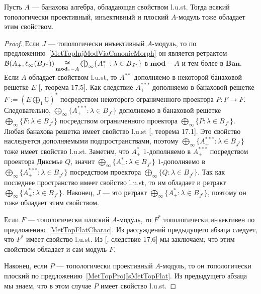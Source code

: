 \begin{proposition} Пусть $A$ --- банахова алгебра, обладающая свойством l.u.st.
Тогда всякий топологически проективный, инъективный и плоский $A$-модуль тоже
обладает этим свойством.
\end{proposition}
\begin{proof} Если $J$ --- топологически инъективный $A$-модуль, то по
предложению~\ref{MetTopInjModViaCanonicMorph} он является ретрактом
$\mathcal{B}(A_+,\ell_\infty(B_{J^*}))\mathop{\mathbin{\cong}}\limits_{\mathbf{mod}_1-A}\bigoplus_\infty
\{ A_+^*:\lambda\in B_{J^*} \}$ в $\mathbf{mod}-A$ и тем более в $\mathbf{Ban}$.
Если $A$ обладает свойством l.u.st, то $A^{**}$ дополняемо в некоторой банаховой
решетке $E$ [\cite{DiestAbsSumOps}, теорема 17.5]. Как следствие $A_+^{***}$
дополняемо в банаховой решетке $F:={\left(E\bigoplus_1\mathbb{C}\right)}^*$
посредством некоторого ограниченного проектора $P:F\to F$. Следовательно,
$\bigoplus_\infty \{A_+^{***}:\lambda\in B_{J^*} \}$ дополняемо в банаховой
решетке $\bigoplus_\infty \{F:\lambda\in B_{J^*} \}$ посредством ограниченного
проектора $\bigoplus_\infty \{ P:\lambda\in B_{J^*} \}$. Любая банахова решетка
имеет свойство l.u.st [\cite{DiestAbsSumOps}, теорема 17.1]. Это свойство
наследуется дополняемыми подпространствами, поэтому $\bigoplus_\infty
\{A_+^{***}:\lambda\in B_{J^*} \}$ тоже имеет свойство l.u.st. Заметим, что
$A_+^*$ $1$-дополняемо в $A_+^{***}$ посредством проектора Диксмье $Q$, значит
$\bigoplus_\infty \{A_+^*:\lambda\in B_{J^*} \}$ $1$-дополняемо в
$\bigoplus_\infty \{A_+^{***}:\lambda\in B_{J^*} \}$ посредством проектора
$\bigoplus_\infty \{Q:\lambda\in B_{J^*} \}$. Так как последнее пространство
имеет свойство l.u.st, то им обладает и ретракт $\bigoplus_\infty
\{A_+^*:\lambda\in B_{J^*} \}$. Наконец, $J$ --- это ретракт $\bigoplus_\infty
\{A_+^*:\lambda\in B_{J^*} \}$, поэтому он тоже обладает этим свойством.

Если $F$ --- топологически плоский $A$-модуль, то $F^*$ топологически инъективен
по предложению~\ref{MetTopFlatCharac}. Из рассуждений предыдущего абзаца
следует, что $F^*$ имеет свойство l.u.st. Из [\cite{DiestAbsSumOps}, следствие
17.6] мы заключаем, что этим свойством обладает и сам модуль $F$.

Наконец, если $P$ --- топологически проективный $A$-модуль, то он топологически
плоский по предложению~\ref{MetTopProjIsMetTopFlat}. Из  предыдущего абзаца мы
знаем, что в этом случае $P$ имеет свойство l.u.st.
\end{proof}


